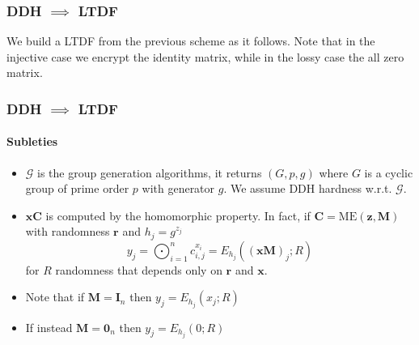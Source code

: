 \documentclass{beamer}
\begin{document}
\begin{frame}
    \frametitle{DDH $\implies$ LTDF}
    We build a LTDF from the previous scheme as it follows. Note
    that in the injective case we encrypt the identity matrix, while
    in the lossy case the all zero matrix.
    \begin{center}
        \begin{pchstack}
            \begin{pcvstack}

                \pcvspace

            \end{pcvstack}
        \end{pchstack}
    \end{center}
\end{frame}
\begin{frame}
    \frametitle{DDH $\implies$ LTDF}
    \framesubtitle{Subleties}
    \begin{itemize}
        \item $\mathcal{G}$ is the group generation algorithms, it returns $(G, p, g)$ where
              $G$ is a cyclic group of prime order $p$ with generator $g$. We assume DDH hardness w.r.t. $\mathcal{G}$.
        \item $\mathbf{xC}$ is computed by the homomorphic property.
              In fact, if $\mathbf{C} = \mathrm{ME}(\mathbf{z}, \mathbf{M})$ with randomness $\mathbf{r}$ and $h_j = g^{z_j}$
              \[ y_j = \bigodot_{i=1}^n c_{i,j}^{x_i} = E_{h_j}((\mathbf{xM})_j ; R) \]
              for $R$ randomness that depends only on $\mathbf{r}$ and $\mathbf{x}$. 

        \item Note that if $\mathbf{M} = \mathbf{I}_n$ then $y_j = E_{h_j}(x_j; R)$
        \item If instead $\mathbf{M} = \mathbf{0}_n$ then $y_j = E_{h_j}(0; R)$
    \end{itemize}
\end{frame}
\end{document}
